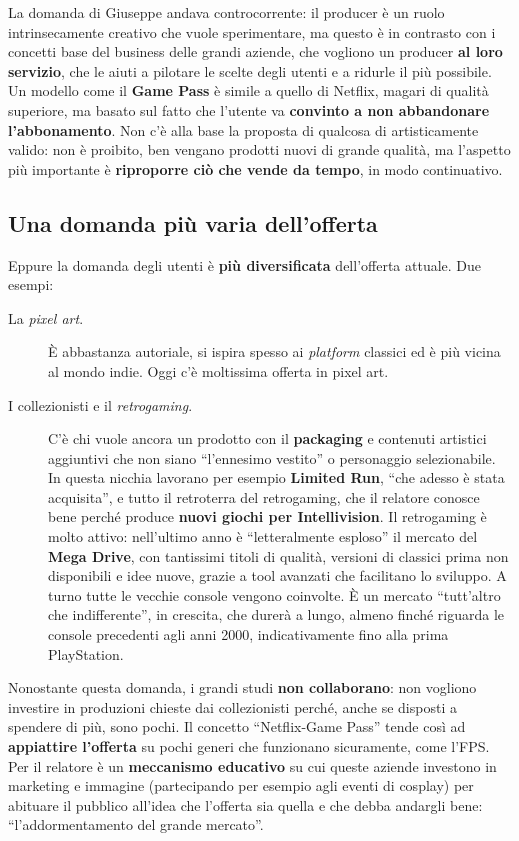 La domanda di Giuseppe andava controcorrente: il producer è un ruolo
intrinsecamente creativo che vuole sperimentare, ma questo è in contrasto con i
concetti base del business delle grandi aziende, che vogliono un producer
\textbf{al loro servizio}, che le aiuti a pilotare le scelte degli utenti e a
ridurle il più possibile. Un modello come il \textbf{Game Pass} è simile a
quello di Netflix, magari di qualità superiore, ma basato sul fatto che
l'utente va \textbf{convinto a non abbandonare l'abbonamento}. Non c'è alla
base la proposta di qualcosa di artisticamente valido: non è proibito, ben
vengano prodotti nuovi di grande qualità, ma l'aspetto più importante è
\textbf{riproporre ciò che vende da tempo}, in modo continuativo.

\subsection{Una domanda più varia dell'offerta}

Eppure la domanda degli utenti è \textbf{più diversificata} dell'offerta
attuale. Due esempi:
\begin{description}
  \item[La \emph{pixel art}.] È abbastanza autoriale, si ispira spesso ai
        \emph{platform} classici ed è più vicina al mondo indie. Oggi c'è
        moltissima offerta in pixel art.
  \item[I collezionisti e il \emph{retrogaming}.] C'è chi vuole ancora un
        prodotto con il \textbf{packaging} e contenuti artistici aggiuntivi che
        non siano ``l'ennesimo vestito'' o personaggio selezionabile. In questa
        nicchia lavorano per esempio \textbf{Limited Run}, ``che adesso è stata
        acquisita'', e tutto il retroterra del retrogaming, che il relatore
        conosce bene perché produce \textbf{nuovi giochi per Intellivision}. Il
        retrogaming è molto attivo: nell'ultimo anno è ``letteralmente
        esploso'' il mercato del \textbf{Mega Drive}, con tantissimi titoli di
        qualità, versioni di classici prima non disponibili e idee nuove, grazie
        a tool avanzati che facilitano lo sviluppo. A turno tutte le vecchie
        console vengono coinvolte. È un mercato ``tutt'altro che
        indifferente'', in crescita, che durerà a lungo, almeno finché riguarda
        le console precedenti agli anni 2000, indicativamente fino alla prima
        PlayStation.
\end{description}

Nonostante questa domanda, i grandi studi \textbf{non collaborano}: non vogliono
investire in produzioni chieste dai collezionisti perché, anche se disposti a
spendere di più, sono pochi. Il concetto ``Netflix-Game Pass'' tende così ad
\textbf{appiattire l'offerta} su pochi generi che funzionano sicuramente, come
l'FPS. Per il relatore è un \textbf{meccanismo educativo} su cui queste aziende
investono in marketing e immagine (partecipando per esempio agli eventi di
cosplay) per abituare il pubblico all'idea che l'offerta sia quella e che debba
andargli bene: ``l'addormentamento del grande mercato''.

